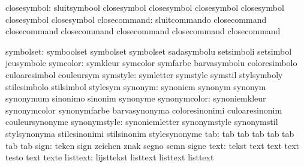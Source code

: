               closesymbol: sluitsymbool              closesymbol
                           closesymbol               closesymbol
                           closesymbol               closesymbol
                           closesymbol
             closecommand: sluitcommando             closecommand
                           closecommand              closecommand
                           closecommand              closecommand
                           closecommand

                symbolset: symboolset                symbolset
                           symbolset                 sadasymbolu
                           setsimboli                setsimbol
                           jeusymbole
                 symcolor: symkleur                  symcolor
                           symfarbe                  barvasymbolu
                           coloresimbolo             culoaresimbol
                           couleursym
                 symstyle: symletter                 symstyle
                           symstil                   stylsymboly
                           stilesimbolo              stilsimbol
                           stylesym
                  synonym: synoniem                  synonym
                           synonym                   synonymum
                           sinonimo                  sinonim
                           synonyme
             synonymcolor: synoniemkleur             synonymcolor
                           synonymfarbe              barvasynonyma
                           coloresinonimi            culoaresinonim
                           couleursynonyme
             synonymstyle: synoniemletter            synonymstyle
                           synonymstil               stylsynonyma
                           stilesinonimi             stilsinonim
                           stylesynonyme
                      tab: tab                       tab
                           tab                       tab
                           tab                       tab
                           tab
                     sign: teken                     sign
                           zeichen                   znak
                           segno                     semn
                           signe
                     text: tekst                     text
                           text                      text
                           testo                     text
                           texte
                 listtext: lijsttekst                listtext
                           listtext                  listtext
